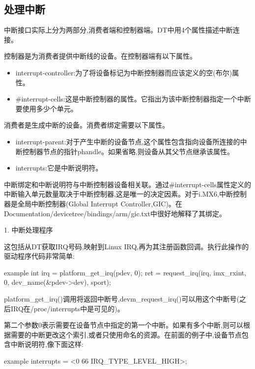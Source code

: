\documentclass[lang=cn,newtx,10pt,scheme=chinese]{elegantbook}
\begin{document}
\subsection{处理中断}

中断接口实际上分为两部分,消费者端和控制器端。DT中用4个属性描述中断连接。

控制器是为消费者提供中断线的设备。在控制器端有以下属性。

\begin{itemize}
\item interrupt-controller:为了将设备标记为中断控制器而应该定义的空(布尔)属性。
\item \#interrupt-cells:这是中断控制器的属性。它指出为该中断控制器指定一个中断要使用多少个单元。
\end{itemize}

消费者是生成中断的设备。消费者绑定需要以下属性。

\begin{itemize}
    \item interrupt-parent:对于产生中断的设备节点,这个属性包含指向设备所连接的中断控制器节点的指针phandle。如果省略,则设备从其父节点继承该属性。
    \item interrupts:它是中断说明符。
\end{itemize}

中断绑定和中断说明符与中断控制器设备相关联。通过\#interrupt-cells属性定义的中断输入单元数量取决于中断控制器,这是唯一的决定因素。对于i.MX6,中断控制器是全局中断控制器(Global Interrupt Controller,GIC)。在Documentation/devicetree/bindings/arm/gic.txt中很好地解释了其绑定。

1. 中断处理程序

这包括从DT获取IRQ号码,映射到Linux IRQ,再为其注册函数回调。执行此操作的驱动程序代码非常简单:

\begin{mycode}{example}
int irq = platform_get_irq(pdev, 0);
ret = request_irq(irq, imx_rxint, 0,
dev_name(&pdev->dev), sport);
\end{mycode}

platform\_get\_irq()调用将返回中断号,devm\_request\_irq()可以用这个中断号(之后IRQ在/proc/interrupts中是可见的)。

第二个参数0表示需要在设备节点中指定的第一个中断。如果有多个中断,则可以根据需要的中断更改这个索引,或者只使用命名的资源。在前面的例子中,设备节点包含中断说明符,像下面这样:

\begin{mycode}{example}
    interrupts = <0 66 IRQ_TYPE_LEVEL_HIGH>;
\end{mycode}
\end{document}
